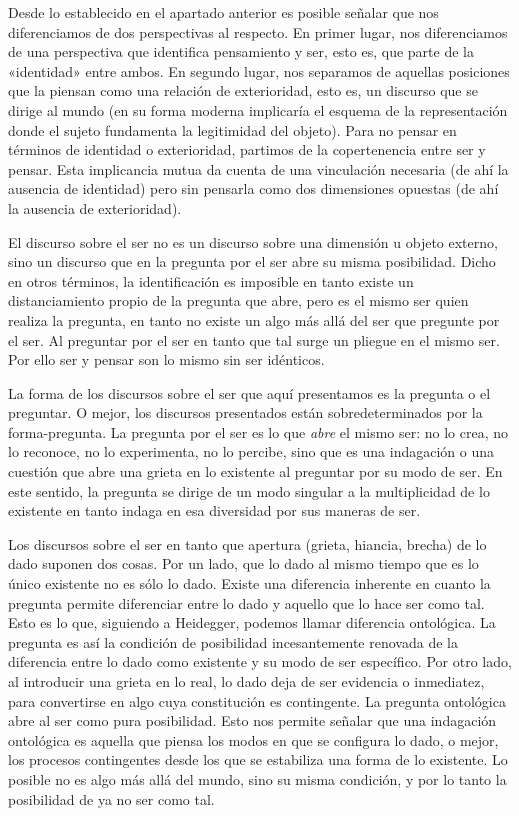 Desde lo establecido en el apartado anterior es posible señalar que nos diferenciamos de dos perspectivas al respecto. En primer lugar, nos diferenciamos de una perspectiva que identifica pensamiento y ser, esto es, que parte de la «identidad» entre ambos. En segundo lugar, nos separamos de aquellas posiciones que la piensan como una relación de exterioridad, esto es, un discurso que se dirige al mundo (en su forma moderna implicaría el esquema de la representación donde el sujeto fundamenta la legitimidad del objeto). Para no pensar en términos de identidad o exterioridad, partimos de la copertenencia entre ser y pensar. Esta implicancia mutua da cuenta de una vinculación necesaria (de ahí la ausencia de identidad) pero sin pensarla como dos dimensiones opuestas (de ahí la ausencia de exterioridad).

El discurso sobre el ser no es un discurso sobre una dimensión u objeto externo, sino un discurso que en la pregunta por el ser abre su misma posibilidad. Dicho en otros términos, la identificación es imposible en tanto existe un distanciamiento propio de la pregunta que abre, pero es el mismo ser quien realiza la pregunta, en tanto no existe un algo más allá del ser que pregunte por el ser. Al preguntar por el ser en tanto que tal surge un pliegue en el mismo ser. Por ello ser y pensar son lo mismo sin ser idénticos.

La forma de los discursos sobre el ser que aquí presentamos es la pregunta o el preguntar. O mejor, los discursos presentados están sobredeterminados por la forma-pregunta. La pregunta por el ser es lo que \emph{abre }el mismo ser: no lo crea, no lo reconoce, no lo experimenta, no lo percibe, sino que es una indagación o una cuestión que abre una grieta en lo existente al preguntar por su modo de ser. En este sentido, la pregunta se dirige de un modo singular a la multiplicidad de lo existente en tanto indaga en esa diversidad por sus maneras de ser.

Los discursos sobre el ser en tanto que apertura (grieta, hiancia, brecha) de lo dado suponen dos cosas. Por un lado, que lo dado al mismo tiempo que es lo único existente no es sólo lo dado. Existe una diferencia inherente en cuanto la pregunta permite diferenciar entre lo dado y aquello que lo hace ser como tal. Esto es lo que, siguiendo a Heidegger, podemos llamar diferencia ontológica. La pregunta es así la condición de posibilidad incesantemente renovada de la diferencia entre lo dado como existente y su modo de ser específico. Por otro lado, al introducir una grieta en lo real, lo dado deja de ser evidencia o inmediatez, para convertirse en algo cuya constitución es contingente. La pregunta ontológica abre al ser como pura posibilidad. Esto nos permite señalar que una indagación ontológica es aquella que piensa los modos en que se configura lo dado, o mejor, los procesos contingentes desde los que se estabiliza una forma de lo existente. Lo posible no es algo más allá del mundo, sino su misma condición, y por lo tanto la posibilidad de ya no ser como tal.

